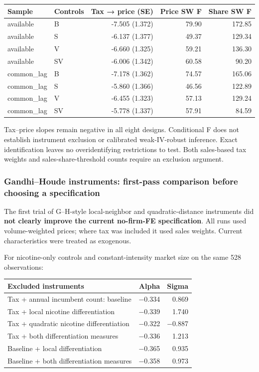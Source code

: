\documentclass[10pt,]{article}
\begin{document}
\begin{longtable}[]{@{}llrrr@{}}
\toprule
Sample & Controls & Tax → price (SE) & Price SW F & Share SW
F\tabularnewline
\midrule
\endhead
available & B & -7.505 (1.372) & 79.90 & 172.85\tabularnewline
available & S & -6.137 (1.377) & 49.37 & 129.34\tabularnewline
available & V & -6.660 (1.325) & 59.21 & 136.30\tabularnewline
available & SV & -6.006 (1.342) & 60.58 & 90.20\tabularnewline
common\_lag & B & -7.178 (1.362) & 74.57 & 165.06\tabularnewline
common\_lag & S & -5.860 (1.366) & 46.56 & 122.89\tabularnewline
common\_lag & V & -6.455 (1.323) & 57.13 & 129.24\tabularnewline
common\_lag & SV & -5.778 (1.337) & 57.91 & 84.59\tabularnewline
\bottomrule
\end{longtable}

Tax--price slopes remain negative in all eight designs. Conditional F
does not establish instrument exclusion or calibrated weak-IV-robust
inference. Exact identification leaves no overidentifying restrictions
to test. Both sales-based tax weights and sales-share-threshold counts
require an exclusion argument.

\subsubsection{Gandhi--Houde instruments: first-pass comparison before
choosing a
specification}\label{gandhihoude-instruments-first-pass-comparison-before-choosing-a-specification}

The first trial of G--H-style local-neighbor and quadratic-distance
instruments did \textbf{not clearly improve the current no-firm-FE
specification}. All runs used volume-weighted prices; where tax was
included it used sales weights. Current characteristics were treated as
exogenous.

For nicotine-only controls and constant-intensity market size on the
same 528 observations:

\begin{longtable}[]{@{}lrr@{}}
\toprule
Excluded instruments & Alpha & Sigma\tabularnewline
\midrule
\endhead
Tax + annual incumbent count: baseline & −0.334 & 0.869\tabularnewline
Tax + local nicotine differentiation & −0.339 & 1.740\tabularnewline
Tax + quadratic nicotine differentiation & −0.322 &
−0.887\tabularnewline
Tax + both differentiation measures & −0.336 & 1.213\tabularnewline
Baseline + local differentiation & −0.365 & 0.935\tabularnewline
Baseline + both differentiation measures & −0.358 & 0.973\tabularnewline
\bottomrule
\end{longtable}
\end{document}
